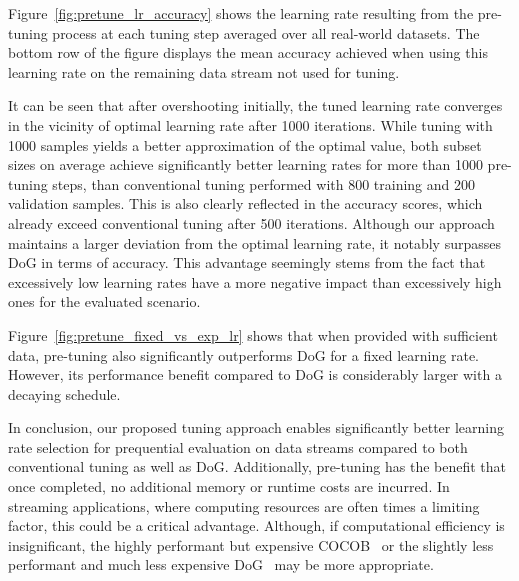 \documentclass[letterpaper]{article} %
\begin{document}
Figure~\ref{fig:pretune_lr_accuracy} shows the learning rate resulting from the pre-tuning process at each tuning step averaged over all real-world datasets.
The bottom row of the figure displays the mean accuracy achieved when using this learning rate on the remaining data stream not used for tuning.

It can be seen that after overshooting initially, the tuned learning rate converges in the vicinity of optimal learning rate after 1000 iterations.
While tuning with 1000 samples yields a better approximation of the optimal value, both subset sizes on average achieve significantly better learning rates for more than 1000 pre-tuning steps, than conventional tuning performed with 800 training and 200 validation samples.
This is also clearly reflected in the accuracy scores, which already exceed conventional tuning after 500 iterations.
Although our approach maintains a larger deviation from the optimal learning rate, it notably surpasses DoG in terms of accuracy.
This advantage seemingly stems from the fact that excessively low learning rates have a more negative impact than excessively high ones for the evaluated scenario.

Figure~\ref{fig:pretune_fixed_vs_exp_lr} shows that when provided with sufficient data, pre-tuning also significantly outperforms DoG for a fixed learning rate.
However, its performance benefit compared to DoG is considerably larger with a decaying schedule.

In conclusion, our proposed tuning approach enables significantly better learning rate selection for prequential evaluation on data streams compared to both conventional tuning as well as DoG.
Additionally, pre-tuning has the benefit that once completed, no additional memory or runtime costs are incurred.
In streaming applications, where computing resources are often times a limiting factor, this could be a critical advantage.
Although, if computational efficiency is insignificant, the highly performant but expensive COCOB~\cite{orabonaTrainingDeepNetworks2017} or the slightly less performant and much less expensive DoG~\cite{ivgiDoGSGDBest2023} may be more appropriate.


\end{document}
